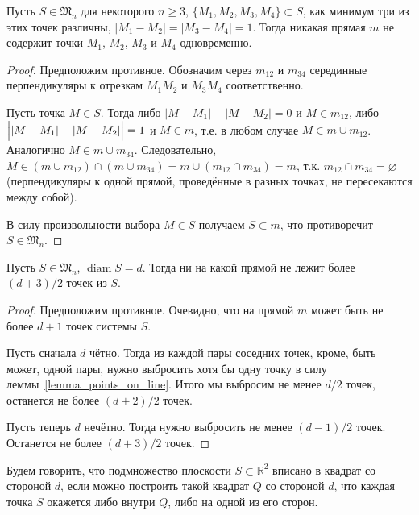 \begin{lemma}
	\label{lemma_points_on_line}
	Пусть $S\in\mathfrak{M}_n$ для некоторого $n \geqslant 3$,
	$\{M_1, M_2, M_3, M_4\} \subset S$, как минимум три из этих точек различны,
	$|M_1 - M_2| = |M_3 - M_4| = 1$.
	Тогда никакая прямая $m$ не содержит точки $M_1$, $M_2$, $M_3$ и $M_4$ одновременно.
\end{lemma}

\begin{proof}
	Предположим противное.
	Обозначим через $m_{12}$ и $m_{34}$ серединные перпендикуляры к отрезкам $M_1 M_2$ и $M_3 M_4$ соответственно.

	Пусть точка $M\in S$.
	Тогда либо $|M - M_1| - |M - M_2| = 0$ и $M\in m_{12}$, либо $\Bigl||M - M_1| - |M - M_2|\Bigr| = 1$ и $M\in m$,
	т.е. в любом случае $M\in m \cup m_{12}$.
	Аналогично $M\in m \cup m_{34}$.
	Следовательно, $M\in (m \cup m_{12}) \cap (m \cup m_{34}) = m \cup (m_{12} \cap m_{34}) = m$,
	т.к. $m_{12} \cap m_{34} = \varnothing$ (перпендикуляры к одной прямой, проведённые в разных точках, не пересекаются между собой).

	В силу произвольности выбора $M \in S$ получаем $S \subset m$, что противоречит $S\in\mathfrak{M}_n$.
\end{proof}

\begin{corollary}
	\label{corollary:max_points_on_line}
	Пусть $S\in\mathfrak{M}_n$, $\operatorname{diam} S = d$.
	Тогда ни на какой прямой не лежит более $(d+3)/2$ точек из $S$.
\end{corollary}

\begin{proof}
	Предположим противное.
	Очевидно, что на прямой $m$ может быть не более $d+1$ точек системы $S$.

	Пусть сначала $d$ чётно.
	Тогда из каждой пары соседних точек, кроме, быть может, одной пары,
	нужно выбросить хотя бы одну точку в силу леммы~\ref{lemma_points_on_line}.
	Итого мы выбросим не менее $d/2$ точек,
	останется не более $(d+2)/2$ точек.

	Пусть теперь $d$ нечётно.
	Тогда нужно выбросить не менее $(d-1)/2$ точек.
	Останется не более $(d+3)/2$ точек.
\end{proof}

\begin{definition}
	Будем говорить, что подмножество плоскости $S\subset\mathbb{R}^2$
	вписано в квадрат со стороной $d$, если
	можно построить такой квадрат $Q$ со стороной $d$,
	что каждая точка $S$ окажется либо внутри $Q$, либо на одной из его сторон.
\end{definition}


